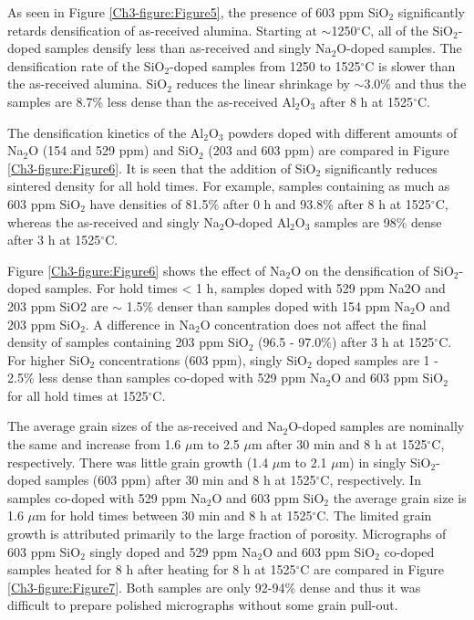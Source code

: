 As seen in Figure \ref{Ch3-figure:Figure5}, the presence of 603 ppm SiO$_{2}$ significantly retards densification of as-received alumina. Starting at $\sim$1250$^{\circ}$C, all of the SiO$_{2}$-doped samples densify less than as-received and singly Na$_{2}$O-doped samples. The densification rate of the SiO$_{2}$-doped samples from 1250 to 1525$^{\circ}$C is slower than the as-received alumina. SiO$_{2}$ reduces the linear shrinkage by $\sim$3.0\% and thus the samples are 8.7\% less dense than the as-received Al$_{2}$O$_{3}$ after 8 h at 1525$^{\circ}$C. 

The densification kinetics of the Al$_{2}$O$_{3}$ powders doped with different amounts of Na$_{2}$O (154 and 529 ppm) and SiO$_{2}$ (203 and 603 ppm) are compared in Figure \ref{Ch3-figure:Figure6}. It is seen that the addition of SiO$_{2}$ significantly reduces sintered density for all hold times. For example, samples containing as much as 603 ppm SiO$_{2}$ have densities of 81.5\% after 0 h and 93.8\% after 8 h at 1525$^{\circ}$C, whereas the as-received and singly Na$_{2}$O-doped Al$_{2}$O$_{3}$ samples are 98\% dense after 3 h at 1525$^{\circ}$C. 

Figure \ref{Ch3-figure:Figure6} shows the effect of Na$_{2}$O on the densification of SiO$_{2}$-doped samples. For hold times < 1 h, samples doped with 529 ppm Na2O and 203 ppm SiO2 are $\sim$ 1.5\% denser than samples doped with 154 ppm Na$_{2}$O and 203 ppm SiO$_{2}$. A difference in Na$_{2}$O concentration does not affect the final density of samples containing 203 ppm SiO$_{2}$ (96.5 - 97.0\%) after 3 h at 1525$^{\circ}$C. For higher SiO$_{2}$ concentrations (603 ppm), singly SiO$_{2}$ doped samples are 1 - 2.5\% less dense than samples co-doped with 529 ppm Na$_{2}$O and 603 ppm SiO$_{2}$ for all hold times at 1525$^{\circ}$C. 

The average grain sizes of the as-received and Na$_{2}$O-doped samples are nominally the same and increase from 1.6 $\mu$m to 2.5 $\mu$m after 30 min and 8 h at 1525$^{\circ}$C, respectively. There was little grain growth (1.4 $\mu$m to 2.1 $\mu$m) in singly SiO$_{2}$-doped samples (603 ppm) after 30 min and 8 h at 1525$^{\circ}$C, respectively. In samples co-doped with 529 ppm Na$_{2}$O and 603 ppm SiO$_{2}$ the average grain size is 1.6 $\mu$m for hold times between 30 min and 8 h at 1525$^{\circ}$C. The limited grain growth is attributed primarily to the large fraction of porosity. Micrographs of 603 ppm SiO$_{2}$ singly doped and 529 ppm Na$_{2}$O and 603 ppm SiO$_{2}$ co-doped samples heated for 8 h after heating for 8 h at 1525$^{\circ}$C are compared in Figure \ref{Ch3-figure:Figure7}. Both samples are only 92-94\% dense and thus it was difficult to prepare polished micrographs without some grain pull-out. 

